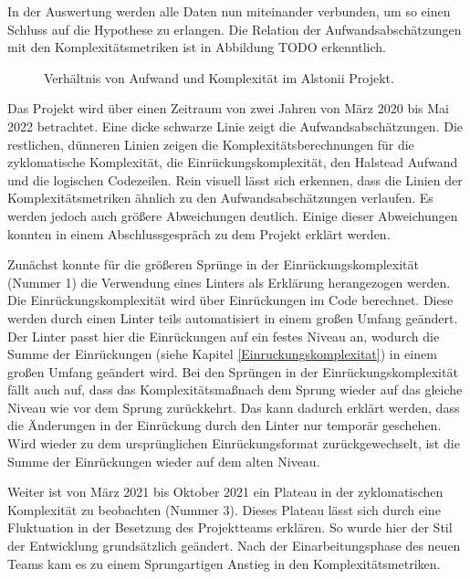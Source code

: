 In der Auswertung werden alle Daten nun miteinander verbunden, um so
einen Schluss auf die Hypothese zu erlangen. Die Relation der
Aufwandsabschätzungen mit den Komplexitätsmetriken ist in Abbildung TODO
erkenntlich.

\begin{figure}\label{alstonii-graph}
  \begin{center}
      
  \end{center}
  \caption{Verhältnis von Aufwand und Komplexität im Alstonii Projekt.}
\end{figure}


Das Projekt wird über einen Zeitraum von zwei Jahren von März 2020 bis
Mai 2022 betrachtet. Eine dicke schwarze Linie zeigt die
Aufwandsabschätzungen. Die restlichen, dünneren Linien zeigen die
Komplexitätsberechnungen für die zyklomatische Komplexität, die
Einrückungskomplexität, den Halstead Aufwand und die logischen
Codezeilen. Rein visuell lässt sich erkennen, dass die Linien der
Komplexitätsmetriken ähnlich zu den Aufwandsabschätzungen verlaufen. Es
werden jedoch auch grö\ss ere Abweichungen deutlich. Einige dieser
Abweichungen konnten in einem Abschlussgespräch zu dem Projekt erklärt
werden.

Zunächst konnte für die grö\ss eren Sprünge in der Einrückungskomplexität
(Nummer 1) die Verwendung eines Linters als Erklärung herangezogen
werden. Die Einrückungskomplexität wird über Einrückungen im Code
berechnet. Diese werden durch einen Linter teils automatisiert in einem
gro\ss en Umfang geändert. Der Linter passt hier die Einrückungen auf ein
festes Niveau an, wodurch die Summe der Einrückungen (siehe Kapitel \ref{Einruckungskomplexitat}) in
einem gro\ss en Umfang geändert wird. Bei den Sprüngen in der
Einrückungskomplexität fällt auch auf, dass das Komplexitätsma\ss  nach dem
Sprung wieder auf das gleiche Niveau wie vor dem Sprung zurückkehrt. Das
kann dadurch erklärt werden, dass die Änderungen in der Einrückung durch
den Linter nur temporär geschehen. Wird wieder zu dem ursprünglichen
Einrückungsformat zurückgewechselt, ist die Summe der Einrückungen
wieder auf dem alten Niveau.

Weiter ist von März 2021 bis Oktober 2021 ein Plateau in der
zyklomatischen Komplexität zu beobachten (Nummer 3). Dieses Plateau
lässt sich durch eine Fluktuation in der Besetzung des Projektteams
erklären. So wurde hier der Stil der Entwicklung grundsätzlich geändert.
Nach der Einarbeitungsphase des neuen Teams kam es zu einem
Sprungartigen Anstieg in den Komplexitätsmetriken.

